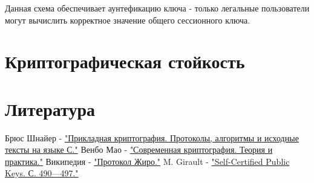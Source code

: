 \documentclass[a4paper]{article}
\begin{document}
Данная схема обеспечивает аунтефикацию ключа - только легальные пользователи могут вычислить корректное значение общего сессионного ключа.
\section{Криптографическая стойкость}

\section{Литература}

\begin{thebibliography}{}
      Брюс Шнайер -  \href{https://lib.mipt.ru/book/n/00013022000cdbe8096da0a688d3a130/Shnaier-B-Prikladnaya-kriptografiya-Protokoly-algoritmy-i-ishodnye-teksty-na-yazyke-S.pdf}{"Прикладная криптография. Протоколы, алгоритмы и исходные тексты на языке С."}
      Венбо Мао -  \href{https://lib.mipt.ru/book/266371/?q=+криптографические+протоколы}{"Современная криптография. Теория и практика."}
      Википедия -  \href{https://ru.wikipedia.org/wiki/Протокол_Жиро}{"Протокол Жиро."}
      M. Girault -  \href{https://doi.org/10.1007/3-540-46416-6_42}{"Self-Certified Public Keys. С. 490—497."}
\end{thebibliography}
\end{document}
